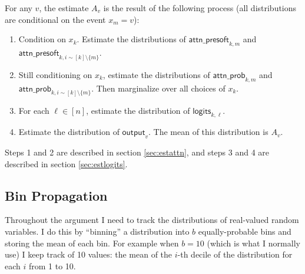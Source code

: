 \documentclass[12pt]{article}
\newcommand{\aps}{\mathsf{attn\_presoft}}
\begin{document}
For any $v$, the estimate $A_v$ is the result of the following process (all distributions are conditional on the event $x_m = v$):
\begin{enumerate}
    \item Condition on $x_k$. Estimate the distributions of $\aps_{k,m}$ and $\aps_{k,i\sim [k]\setminus \{m\}}$.
    \item Still conditioning on $x_k$, estimate the distributions of $\mathsf{attn\_prob}_{k,m}$ and $\mathsf{attn\_prob}_{k,i\sim [k]\setminus \{m\}}$. Then marginalize over all choices of $x_k$.
    \item For each $\ell \in [n]$, estimate the distribution of $\mathsf{logits}_{k, \ell}$.
    \item Estimate the distribution of $\mathsf{output}_v$. The mean of this distribution is $A_v$.
\end{enumerate}

Steps 1 and 2 are described in section \ref{sec:estattn}, and steps 3 and 4 are described in section \ref{sec:estlogits}.

\subsection{Bin Propagation}
Throughout the argument I need to track the distributions of real-valued random variables. I do this by “binning” a distribution into \( b \) equally-probable bins and storing the mean of each bin. For example when \( b = 10 \) (which is what I normally use) I keep track of 10 values: the mean of the \( i \)-th decile of the distribution for each \( i \) from 1 to 10.
\end{document}
